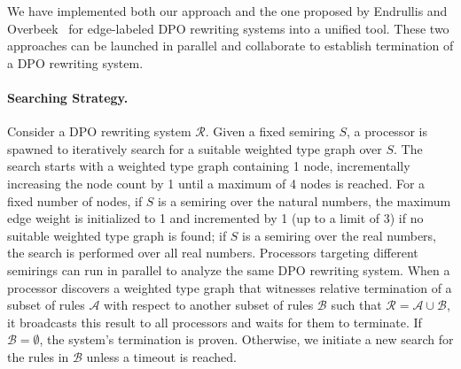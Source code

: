 We have implemented both our approach and the one proposed by Endrullis and Overbeek~\cite{endrullis2024generalized_arxiv_v2} for edge-labeled DPO rewriting systems into a unified tool. These two approaches can be launched in parallel and collaborate to establish termination of a DPO rewriting system. 
\paragraph{Searching Strategy.}
Consider a DPO rewriting system $\mathcal{R}$. Given a fixed semiring $S$, a processor is spawned to iteratively search for a suitable weighted type graph over $S$.
The search starts with a weighted type graph containing 1 node, incrementally increasing the node count by 1 until a maximum of 4 nodes is reached.
For a fixed number of nodes,
 if $S$ is a semiring over the natural numbers, the maximum edge weight is initialized to 1 and incremented by 1 (up to a limit of 3) if no suitable weighted type graph is found;
if $S$ is a semiring over the real numbers, the search is performed over all real numbers.
Processors targeting different semirings can run in parallel to analyze the same DPO rewriting system.
When a processor discovers a weighted type graph that witnesses relative termination of a subset of rules $\mathcal{A}$ with respect to another subset of rules $\mathcal{B}$ such that $\mathcal{R} = \mathcal{A} \cup \mathcal{B}$, it broadcasts this result to all processors and waits for them to terminate. If $\mathcal{B} = \emptyset$, the system's termination is proven. Otherwise, we initiate a new search for the rules in $\mathcal{B}$ unless a timeout is reached.
 
